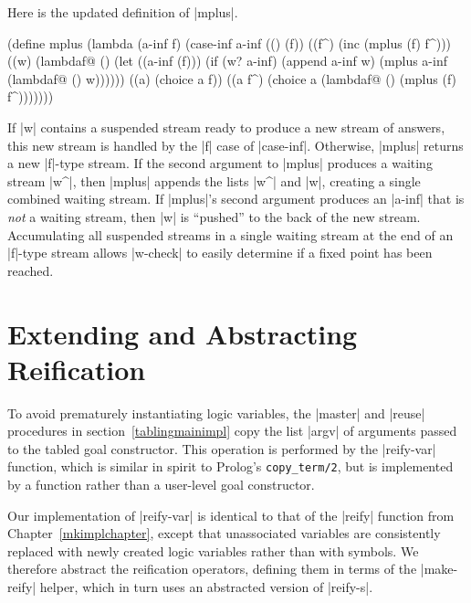 Here is the updated definition of \scheme|mplus|.

\schemedisplayspace
\begin{schemedisplay} 
(define mplus
  (lambda (a-inf f)
    (case-inf a-inf
      (() (f))
      ((f^) (inc (mplus (f) f^)))
      ((w) (lambdaf@ () (let ((a-inf (f)))
                          (if (w? a-inf)
                              (append a-inf w)
                              (mplus a-inf (lambdaf@ () w))))))
      ((a) (choice a f))
      ((a f^) (choice a (lambdaf@ () (mplus (f) f^)))))))
\end{schemedisplay}

\noindent If \scheme|w| contains a suspended stream ready to produce a
new stream of answers, this new stream is handled by the \scheme|f|
case of \scheme|case-inf|.  Otherwise, \scheme|mplus| returns a new
\scheme|f|-type stream.  If the second argument to \scheme|mplus|
produces a waiting stream \scheme|w^|, then \scheme|mplus| appends the
lists \scheme|w^| and \scheme|w|, creating a single combined waiting
stream.  If \scheme|mplus|'s second argument produces an
\scheme|a-inf| that is \emph{not} a waiting stream, then \scheme|w| is
``pushed'' to the back of the new stream.  Accumulating all suspended
streams in a single waiting stream at the end of an \scheme|f|-type
stream allows \scheme|w-check| to easily determine if a fixed point
has been reached.

\section{Extending and Abstracting Reification}\label{tablingreify}

To avoid prematurely instantiating logic variables, the
\scheme|master| and \scheme|reuse| procedures in
section~\ref{tablingmainimpl} copy the list \scheme|argv| of arguments
passed to the tabled goal constructor.  This operation is performed by the
\scheme|reify-var| function, which is similar in spirit to Prolog's
\mbox{{\tt copy\_term/2}}, but is implemented by a function rather than a
user-level goal constructor.

Our implementation of \scheme|reify-var| is identical to that of the
\scheme|reify| function from Chapter~\ref{mkimplchapter}, except that
unassociated variables are consistently replaced with newly created
logic variables rather than with symbols.  We therefore abstract the
reification operators, defining them in terms of the
\scheme|make-reify| helper, which in turn uses an abstracted version
of \scheme|reify-s|.

